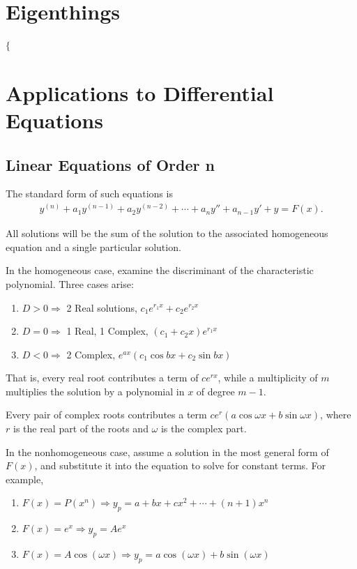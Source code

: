 \documentclass[a4paper,10pt]{report}
\begin{document}
\chapter{Eigenthings}
$\lbrace$

\chapter{Applications to Differential Equations}
\section{Linear Equations of Order n}
The standard form of such equations is
\begin{align*}
	y^{(n)} + a_1y^{(n-1)} + a_2y^{(n-2)} + \cdots +a_ny'' + a_{n-1}y' + y = F(x).
\end{align*}

All solutions will be the sum of the solution to the associated homogeneous equation and a single particular solution.

In the homogeneous case, examine the discriminant of the characteristic polynomial. Three cases arise:
\begin{enumerate}
	\item $D>0 \Rightarrow$ 2 Real solutions, $c_1e^{r_1x} + c_2e^{r_2x}$
	\item $D=0 \Rightarrow$ 1 Real, 1 Complex, $(c_1 +c_2x)e^{r_1x}$
	\item $D<0 \Rightarrow$ 2 Complex, $e^{ax}(c_1\cos bx + c_2\sin bx)$
\end{enumerate}
That is, every real root contributes a term of $ce^{rx}$, while a multiplicity of $m$ multiplies the solution by a polynomial in $x$ of degree $m-1$.

Every pair of complex roots contributes a term $ce^r(a\cos \omega x + b\sin \omega x)$, where $r$ is the real part of the roots and $\omega$ is the complex part.

In the nonhomogeneous case, assume a solution in the most general form of $F(x)$, and substitute it into the equation to solve for constant terms. For example,
\begin{enumerate}
	\item $F(x) = P(x^n) \Rightarrow y_p = a+bx+cx^2+\cdots+(n+1)x^n$
	\item $F(x) = e^x \Rightarrow y_p = Ae^x$
	\item $F(x) = A\cos (\omega x) \Rightarrow y_p = a\cos(\omega x) + b\sin(\omega x)$
\end{enumerate}
\end{document}
